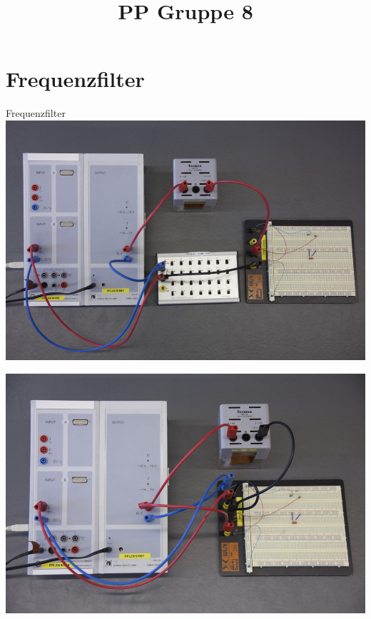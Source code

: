\documentclass[11pt]{beamer}
\title{PP Gruppe 8}
\begin{document}
\frame[c]{\titlepage}
\begin{frame}
\tableofcontents
\end{frame}

\section{Frequenzfilter}
\begin{frame}{Frequenzfilter}
	\includegraphics[width=\textwidth]{images/1/durchlassfilter}
\end{frame}
\begin{frame}
	\includegraphics[width=\textwidth]{images/1/sperrfilter}
\end{frame}
\end{document}
